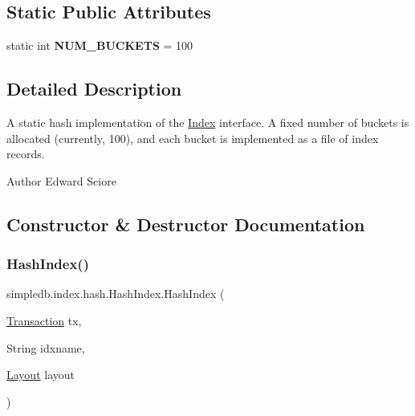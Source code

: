 \subsection*{Static Public Attributes}
\begin{DoxyCompactItemize}
\item 
\mbox{\label{classsimpledb_1_1index_1_1hash_1_1HashIndex_aad7e21d37fcc72b80702160788f2a196}} 
static int {\bfseries N\+U\+M\+\_\+\+B\+U\+C\+K\+E\+TS} = 100
\end{DoxyCompactItemize}


\subsection{Detailed Description}
A static hash implementation of the \hyperlink{interfacesimpledb_1_1index_1_1Index}{Index} interface. A fixed number of buckets is allocated (currently, 100), and each bucket is implemented as a file of index records. \begin{DoxyAuthor}{Author}
Edward Sciore 
\end{DoxyAuthor}


\subsection{Constructor \& Destructor Documentation}
\mbox{\label{classsimpledb_1_1index_1_1hash_1_1HashIndex_a3a54c91a803eae272f449ab878274fc2}} 
\subsubsection{\texorpdfstring{Hash\+Index()}{HashIndex()}}
{\footnotesize\ttfamily simpledb.\+index.\+hash.\+Hash\+Index.\+Hash\+Index (\begin{DoxyParamCaption}\item[{\hyperlink{classsimpledb_1_1tx_1_1Transaction}{Transaction}}]{tx,  }\item[{String}]{idxname,  }\item[{\hyperlink{classsimpledb_1_1record_1_1Layout}{Layout}}]{layout }\end{DoxyParamCaption})\hspace{0.3cm}{\ttfamily [inline]}}

